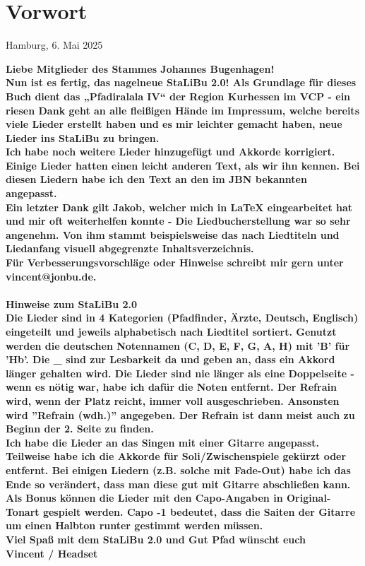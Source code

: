 \section*{Vorwort}

\begin{flushright}
    Hamburg, 6. Mai 2025
\end{flushright}


\bf Liebe Mitglieder des Stammes Johannes Bugenhagen! \sf \\

Nun ist es fertig, das nagelneue StaLiBu 2.0! Als Grundlage für dieses Buch dient das „Pfadiralala IV“ der Region Kurhessen im VCP - ein riesen Dank geht an alle fleißigen Hände im Impressum, welche bereits viele Lieder erstellt haben und es mir leichter gemacht haben, neue Lieder ins StaLiBu zu bringen. \\

Ich habe noch weitere Lieder hinzugefügt und Akkorde korrigiert. Einige Lieder hatten einen leicht anderen Text, als wir ihn kennen. Bei diesen Liedern habe ich den Text an den im JBN bekannten angepasst. \\

Ein letzter Dank gilt Jakob, welcher mich in LaTeX eingearbeitet hat und mir oft weiterhelfen konnte - Die Liedbucherstellung war so sehr angenehm. Von ihm stammt beispielsweise das nach Liedtiteln und Liedanfang visuell abgegrenzte Inhaltsverzeichnis. \\

Für Verbesserungsvorschläge oder Hinweise schreibt mir gern unter vincent@jonbu.de. \\ \\

\bf Hinweise zum StaLiBu 2.0 \sf \\

Die Lieder sind in 4 Kategorien (Pfadfinder, Ärzte, Deutsch, Englisch) eingeteilt und jeweils alphabetisch nach Liedtitel sortiert. Genutzt werden die deutschen Notennamen (C, D, E, F, G, A, H) mit 'B' für 'Hb'. \newline
Die \_ sind zur Lesbarkeit da und geben an, dass ein Akkord länger gehalten wird. Die Lieder sind nie länger als eine Doppelseite - wenn es nötig war, habe ich dafür die Noten entfernt. Der Refrain wird, wenn der Platz reicht, immer voll ausgeschrieben. Ansonsten wird ''Refrain (wdh.)'' angegeben. Der Refrain ist dann meist auch zu Beginn der 2. Seite zu finden. \\

Ich habe die Lieder an das Singen mit einer Gitarre angepasst. Teilweise habe ich die Akkorde für Soli/Zwischenspiele gekürzt oder entfernt. Bei einigen Liedern (z.B. solche mit Fade-Out) habe ich das Ende so verändert, dass man diese gut mit Gitarre abschließen kann.
Als Bonus können die Lieder mit den Capo-Angaben in Original-Tonart gespielt werden. Capo -1 bedeutet, dass die Saiten der Gitarre um einen Halbton runter gestimmt werden müssen. \\

Viel Spaß mit dem StaLiBu 2.0 und Gut Pfad wünscht euch\\
Vincent / Headset